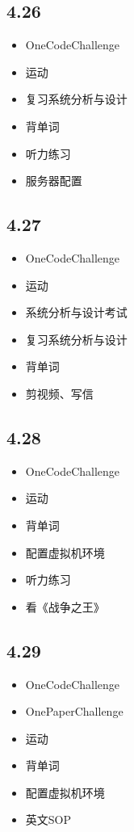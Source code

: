 \documentclass[UTF8]{ctexart}
\begin{document}
\subsection*{4.26}
\begin{itemize}
    \item OneCodeChallenge
    \item 运动
    \item 复习系统分析与设计
    \item 背单词
    \item 听力练习
    \item 服务器配置
\end{itemize}

\subsection*{4.27}
\begin{itemize}
    \item OneCodeChallenge
    \item 运动
    \item 系统分析与设计考试
    \item 复习系统分析与设计
    \item 背单词
    \item 剪视频、写信
\end{itemize}

\subsection*{4.28}
\begin{itemize}
    \item OneCodeChallenge
    \item 运动
    \item 背单词
    \item 配置虚拟机环境
    \item 听力练习
    \item 看《战争之王》
\end{itemize}

\subsection*{4.29}
\begin{itemize}
    \item OneCodeChallenge
    \item OnePaperChallenge
    \item 运动
    \item 背单词
    \item 配置虚拟机环境
    \item 英文SOP
\end{itemize}
\end{document}
